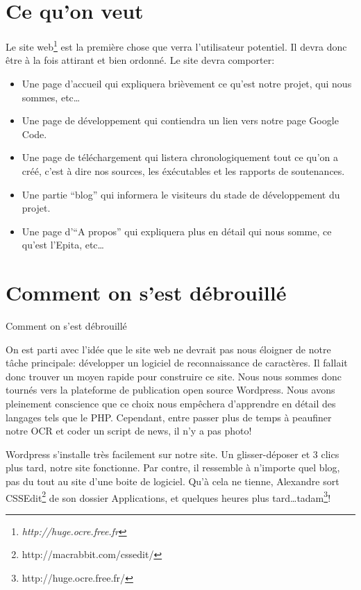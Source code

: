 \documentclass[]{report}
\begin{document}
		\section{Ce qu'on veut} %
		\label{sec:ce_qu_on_veut}
		Le site web\footnote{\emph{http://huge.ocre.free.fr}} est la premi\`ere chose que verra l'utilisateur potentiel. Il devra donc \^etre \`a la fois attirant et bien ordonn\'e. Le site devra comporter:
		\begin{itemize}
			\item Une page d'accueil qui expliquera bri\`evement ce qu'est notre projet, qui nous sommes, etc\ldots
			\item Une page de d\'eveloppement qui contiendra un lien vers notre page Google Code.
			\item Une page de t\'el\'echargement qui listera chronologiquement tout ce qu'on a cr\'e\'e, c'est \`a dire nos sources, les \'ex\'ecutables et les rapports de soutenances.
			\item Une partie ``blog'' qui informera le visiteurs du stade de d\'eveloppement du projet.
			\item Une page d'``A propos'' qui expliquera plus en d\'etail qui nous somme, ce qu'est l'Epita, etc\ldots
		\end{itemize}
		\section{Comment on s'est d\'ebrouill\'e} %
		\label{sec:comment_on_s_est_d'ebrouill'e}
		Comment on s'est débrouillé

			On est parti avec l'idée que le site web ne devrait pas nous éloigner de notre tâche principale: développer un logiciel de reconnaissance de caractères. Il fallait donc trouver un moyen rapide pour construire ce site. Nous nous sommes donc tournés vers la plateforme de publication open source Wordpress.
			Nous avons pleinement conscience que ce choix nous empêchera d'apprendre en détail des langages tels que le PHP. Cependant, entre passer plus de temps à peaufiner notre OCR et coder un script de news, il n'y a pas photo!

			Wordpress s'installe très facilement sur notre site. Un glisser-déposer et 3 clics plus tard, notre site fonctionne. Par contre, il ressemble à n'importe quel blog, pas du tout au site d'une boite de logiciel. Qu'à cela ne tienne, Alexandre sort CSSEdit\footnote{http://macrabbit.com/cssedit/} de son dossier Applications, et quelques heures plus tard\ldots tadam\footnote{http://huge.ocre.free.fr/}!
\end{document}

